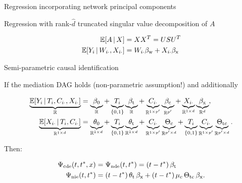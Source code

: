 \documentclass{beamer}
\theoremstyle{remark}
\begin{document}
\begin{frame}{Regression incorporating network principal components}

    Regression with rank-$\widehat{d}$ truncated singular value decomposition of $A$

    \begin{align*}
        \E[\X]{A}                           & = \X \X^T = \Upop \Spop \Upop^T             \\
        \E[\W_{i \cdot}, \X_{i \cdot}]{Y_i} & = \W_{i \cdot} \betaw + \X_{i \cdot} \betax
    \end{align*}

\end{frame}

\begin{frame}{Semi-parametric causal identification}

    If the mediation DAG holds (non-parametric assumption!) and additionally


    \begin{equation*} \begin{aligned}
            \underbrace{\E[T_i, \C_{i \cdot}, \X_{i \cdot}]{Y_i}}_{\R}
             & = \underbrace{\betazero}_{\R}
            + \underbrace{T_i}_{\{0, 1\}} \underbrace{\betat}_{\R}
            + \underbrace{\C_{i \cdot}}_{\R^{1 \times p'}} \underbrace{\betac}_{\R^{p'}}
            + \underbrace{\X_{i \cdot}}_{\R^{1 \times d}} \underbrace{\betax}_{\R^d}, \\
            \underbrace{\E[T_i, \C_{i \cdot}]{\X_{i \cdot}}}_{\R^{1 \times d}}
             & = \underbrace{\thetazero}_{\R^{1 \times d}}
            + \underbrace{T_i}_{\{0, 1\}} \underbrace{\thetat}_{\R^{1 \times d}}
            + \underbrace{\C_{i \cdot}}_{\R^{1 \times p'}} \underbrace{\Thetac}_{\R^{p' \times d}}
            + \underbrace{T_i}_{\{0, 1\}} \underbrace{\C_{i \cdot}}_{\R^{1 \times p'}} \underbrace{\Thetatc}_{\R^{p' \times d}}.
        \end{aligned} \end{equation*}

    Then:

    \begin{align*}
        \cdef & = \ndef = \paren*{t - t^*} \, \betat                                                \\
        \nief & = \paren*{t - t^*} \, \thetat \, \betax + (t - t^*) \, \mu_c \, \Thetatc \, \betax.
    \end{align*}

\end{frame}
\end{document}
